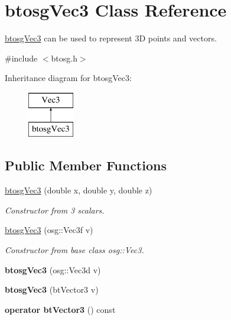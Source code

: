 \hypertarget{classbtosgVec3}{}\section{btosg\+Vec3 Class Reference}
\label{classbtosgVec3}


\hyperlink{classbtosgVec3}{btosg\+Vec3} can be used to represent 3D points and vectors.  




{\ttfamily \#include $<$btosg.\+h$>$}

Inheritance diagram for btosg\+Vec3\+:\begin{figure}[H]
\begin{center}
\leavevmode
\includegraphics[height=2.000000cm]{classbtosgVec3}
\end{center}
\end{figure}
\subsection*{Public Member Functions}
\begin{DoxyCompactItemize}
\item 
\hyperlink{classbtosgVec3_a8bebd055644195494a10937ca754f55b}{btosg\+Vec3} (double x, double y, double z)
\begin{DoxyCompactList}\small\item\em Constructor from 3 scalars. \end{DoxyCompactList}\item 
\hyperlink{classbtosgVec3_a029392a1bc72f7031b8ca99aa814e2a1}{btosg\+Vec3} (osg\+::\+Vec3f v)
\begin{DoxyCompactList}\small\item\em Constructor from base class osg\+::\+Vec3. \end{DoxyCompactList}\item 
\mbox{\label{classbtosgVec3_a34c56d6b0bb27fffa5f4089d7a81b320}} 
{\bfseries btosg\+Vec3} (osg\+::\+Vec3d v)
\item 
\mbox{\label{classbtosgVec3_a2c7014fd9cd67b1918fdf2f53e0d1372}} 
{\bfseries btosg\+Vec3} (bt\+Vector3 v)
\item 
\mbox{\label{classbtosgVec3_a8e9e5bea1a46ba76e213a3f6e5e14dba}} 
{\bfseries operator bt\+Vector3} () const
\end{DoxyCompactItemize}


